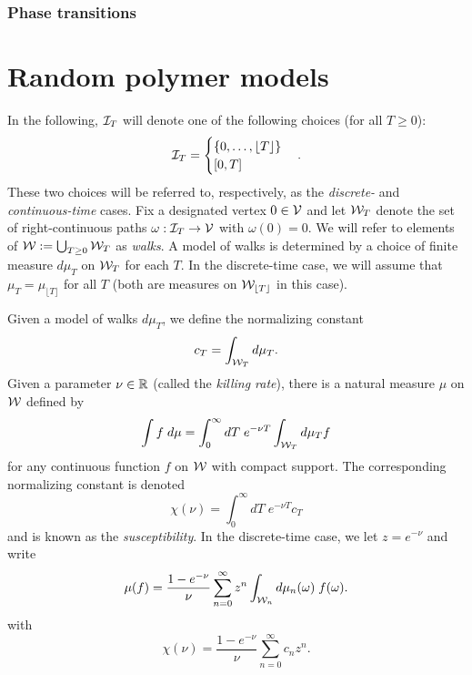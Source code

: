 \subsubsection{Phase transitions}



\section{Random polymer models}


In the following, $\mathcal{I}_T$ will denote one of the following choices (for all $T \ge 0$):
\begin{equation}
\mathcal{I}_T
  =
\begin{cases}
\{ 0, \ldots, \lfloor T \rfloor \} \\
[0, T]
\end{cases}.
\end{equation}
These two choices will be referred to, respectively, as the \emph{discrete-} and
\emph{continuous-time} cases.
Fix a designated vertex $0 \in \mathcal{V}$ and
let $\mathcal{W}_T$ denote the set of
right-continuous paths $\omega : \mathcal{I}_T \rightarrow \mathcal{V}$ with $\omega(0) = 0$.
We will refer to elements of $\mathcal{W} := \bigcup_{T \geq 0} \mathcal{W}_T$ as \emph{walks}.
A model of walks is determined by a choice of finite measure $d\mu_T$ on
$\mathcal{W}_T$ for each $T$.
In the discrete-time case, we will assume that
$\mu_T = \mu_{\lfloor T \rfloor}$ for all $T$ (both are measures on
$\mathcal{W}_{\lfloor T \rfloor}$ in this case).

Given a model of walks $d\mu_T$, we define the normalizing constant
\begin{equation}
c_T = \int_{\mathcal{W}_T} d\mu_T.
\end{equation}
Given a parameter $\nu \in {\mathbb R}$ (called the \emph{killing rate}),
there is a natural measure $\mu$ on $\mathcal{W}$ defined by
\begin{equation}
\int f \; d\mu
  =
\int_0^\infty dT \; e^{-\nu T} \int_{\mathcal{W}_T} d\mu_T f
\end{equation}
for any continuous function $f$ on $\mathcal{W}$ with compact support.
The corresponding normalizing constant is denoted
\begin{equation}
\chi(\nu) = \int_0^\infty dT \; e^{-\nu T} c_T
\end{equation}
and is known as the \emph{susceptibility}. In the discrete-time case,
we let $z = e^{-\nu}$ and write
\begin{equation}
\mu(f)
  =
\frac{1 - e^{-\nu}}{\nu} \sum_{n=0}^\infty z^n \int_{\mathcal{W}_n} d\mu_n(\omega) \; f(\omega).
\end{equation}
with
\begin{equation}
\chi(\nu) = \frac{1 - e^{-\nu}}{\nu} \sum_{n=0}^\infty c_n z^n.
\end{equation}

